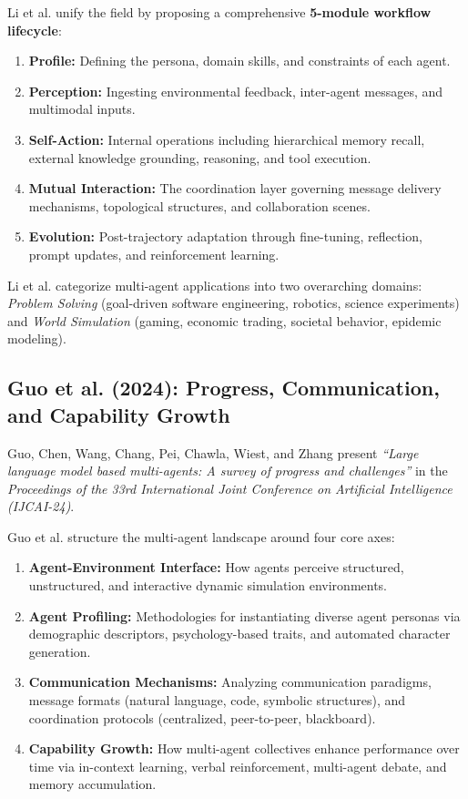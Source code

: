 \documentclass[12pt,a4paper]{report}
\begin{document}
Li et al. unify the field by proposing a comprehensive \textbf{5-module workflow lifecycle}:
\begin{enumerate}
    \item \textbf{Profile:} Defining the persona, domain skills, and constraints of each agent.
    \item \textbf{Perception:} Ingesting environmental feedback, inter-agent messages, and multimodal inputs.
    \item \textbf{Self-Action:} Internal operations including hierarchical memory recall, external knowledge grounding, reasoning, and tool execution.
    \item \textbf{Mutual Interaction:} The coordination layer governing message delivery mechanisms, topological structures, and collaboration scenes.
    \item \textbf{Evolution:} Post-trajectory adaptation through fine-tuning, reflection, prompt updates, and reinforcement learning.
\end{enumerate}
Li et al. categorize multi-agent applications into two overarching domains: \textit{Problem Solving} (goal-driven software engineering, robotics, science experiments) and \textit{World Simulation} (gaming, economic trading, societal behavior, epidemic modeling).

\subsection{Guo et al. (2024): Progress, Communication, and Capability Growth}
Guo, Chen, Wang, Chang, Pei, Chawla, Wiest, and Zhang \cite{guo2024large} present \textit{``Large language model based multi-agents: A survey of progress and challenges''} in the \textit{Proceedings of the 33rd International Joint Conference on Artificial Intelligence (IJCAI-24)}. 

Guo et al. structure the multi-agent landscape around four core axes:
\begin{enumerate}
    \item \textbf{Agent-Environment Interface:} How agents perceive structured, unstructured, and interactive dynamic simulation environments.
    \item \textbf{Agent Profiling:} Methodologies for instantiating diverse agent personas via demographic descriptors, psychology-based traits, and automated character generation.
    \item \textbf{Communication Mechanisms:} Analyzing communication paradigms, message formats (natural language, code, symbolic structures), and coordination protocols (centralized, peer-to-peer, blackboard).
    \item \textbf{Capability Growth:} How multi-agent collectives enhance performance over time via in-context learning, verbal reinforcement, multi-agent debate, and memory accumulation.
\end{enumerate}
\end{document}
